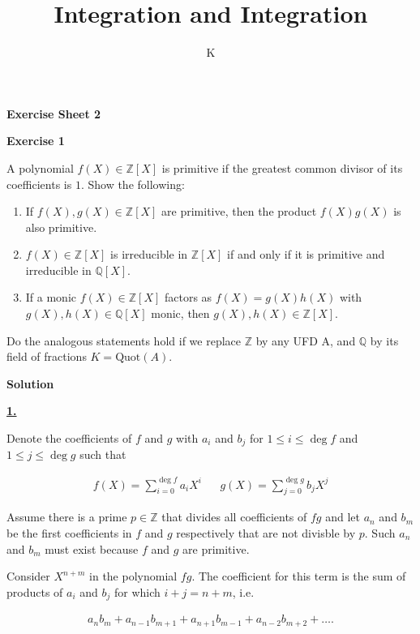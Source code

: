 \documentclass[a4paper]{article}
\title{Integration and Integration}
\author{K}
\theoremstyle{definition}
\begin{document}
\begin{center}
    \noindent\textbf{Exercise Sheet 2}
\end{center}
\noindent\textbf{Exercise 1}

\noindent A polynomial \(f(X) \in \mathbb{Z}[X]\) is primitive if the greatest common divisor of its coefficients is \(1\). Show the following:
\begin{enumerate}
    \item If \(f(X), g(X) \in \mathbb{Z}[X]\) are primitive, then the product \(f(X)g(X)\) is also primitive.
    \item \(f(X) \in \mathbb{Z}[X]\) is irreducible in \(\mathbb{Z}[X]\) if and only if it is primitive and irreducible in \(\mathbb{Q}[X]\).
    \item If a monic \(f(X) \in \mathbb{Z}[X]\) factors as \(f(X) = g(X)h(X)\) with \(g(X), h(X) \in \mathbb{Q}[X]\) monic, then \(g(X), h(X) \in \mathbb{Z}[X]\).
\end{enumerate}
Do the analogous statements hold if we replace \(\mathbb{Z}\) by any UFD A, and \(\mathbb{Q}\) by its field of fractions \(K = \text{Quot}(A)\).

\bigskip

\noindent\textbf{Solution}

\noindent\underline{\textbf{1.}}

\noindent Denote the coefficients of \(f\) and \(g\) with \(a_i\) and \(b_j\) for \(1 \leq i \leq \deg f\) and \(1 \leq j \leq \deg g\) such that

\begin{align}
    f(X) = \sum_{i = 0}^{\deg f} a_i X^i && g(X) = \sum_{j = 0}^{\deg g} b_j X^j
\end{align}

\noindent Assume there is a prime \(p \in \mathbb{Z}\) that divides all coefficients of \(fg\) and let \(a_n\) and \(b_m\) be the first coefficients in \(f\) and \(g\) respectively that are not divisble by \(p\). Such \(a_n\) and \(b_m\) must exist because \(f\) and \(g\) are primitive.

\bigskip

\noindent Consider \(X^{n + m}\) in the polynomial \(fg\). The coefficient for this term is the sum of products of \(a_i\) and \(b_j\) for which \(i + j = n + m\), i.e.

\begin{align}
    a_n b_m + a_{n - 1} b_{m+1} + a_{n + 1} b_{m - 1} + a_{n - 2} b_{m + 2} + \dots \text{.}
\end{align}
\end{document}
